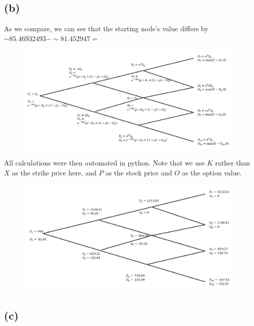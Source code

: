 \documentclass{article}
\begin{document}
{\newpage

\subsection*{(b)}

As we compare, we can see that the starting node's value differs by $\sim 85.46932493 - \sim 81.452947 = $ 

\begin{figure}[h]
  \centering
  \includegraphics[width=120mm]{./2b_tree.png}
\end{figure}

All calculations were then automated in python. Note that we use $K$ rather than $X$ as the strike price here, and $P$ as the stock price and $O$ as the option value.

\begin{figure}[h]
  \centering
  \includegraphics[width=120mm]{./2b_finaltree.png}
\end{figure}

\subsection*{(c)}


}
\end{document}
